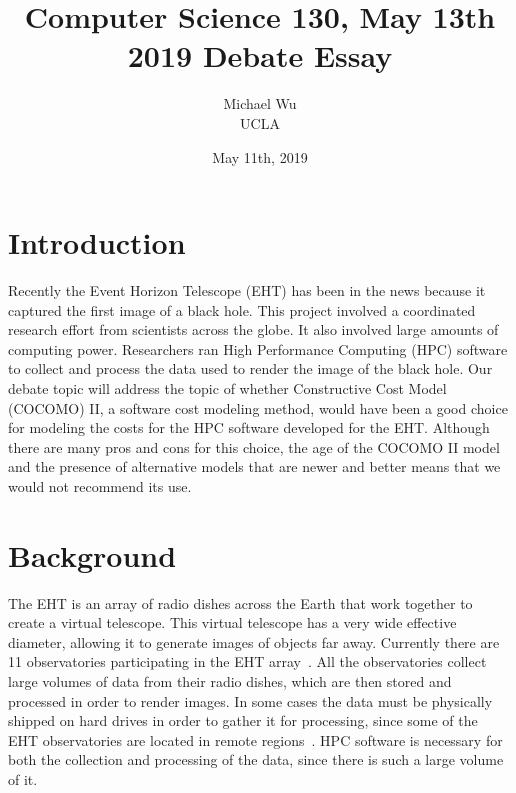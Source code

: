 \documentclass[letterpaper,twocolumn,10pt]{article}
\begin{document}
\title{Computer Science 130, May 13th 2019 Debate Essay}
\date{May 11th, 2019}
\author{{\rm Michael Wu}\\UCLA}
\maketitle

\section{Introduction}

Recently the Event Horizon Telescope (EHT) has been in the news because it captured the first image of a black hole. This
project involved a coordinated research effort from scientists across the globe. It also involved large amounts of computing power.
Researchers ran High Performance Computing (HPC) software to collect and process the data used to render the image of the
black hole. Our debate topic will address the topic of whether Constructive Cost Model (COCOMO) II, a software cost modeling method, would have been a good
choice for modeling the costs for the HPC software developed for the EHT. Although there are many pros and cons for this choice,
the age of the COCOMO II model and the presence of alternative models that are newer and better means that we would not recommend its use.

\section{Background}

The EHT is an array of radio dishes across the Earth that work together to create a virtual telescope. This virtual telescope has
a very wide effective diameter, allowing it to generate images of objects far away. Currently there are 11 observatories participating
in the EHT array~\cite{EHT}. All the observatories collect large volumes of data from their radio dishes, which are then stored and
processed in order to render images. In some cases the data must be physically shipped on hard drives in order to gather it for processing, since
some of the EHT observatories are located in remote regions~\cite{EHT}. HPC software is necessary for both the collection and processing
of the data, since there is such a large volume of it.
\end{document}
